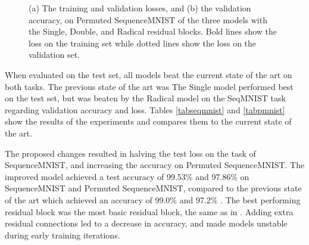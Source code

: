 \documentclass[a4paper, twoside]{article}
\begin{document}
\begin{figure}[h]
    \centering
  	\caption{(a) The training and validation losses, and (b) the validation accuracy, on Permuted SequenceMNIST of the three models with the Single, Double, and Radical residual blocks. Bold lines show the loss on the training set while dotted lines show the loss on the validation set.} \label{figpmnistfig}
\end{figure}

When evaluated on the test set, all models beat the current state of the art on both tasks. The previous state of the art was The Single model performed best on the test set, but was beaten by the Radical model on the SeqMNIST task regarding validation accuracy and loss. Tables \ref{tabseqmnist} and \ref{tabpmnist} show the results of the experiments and compares them to the current state of the art.

The proposed changes resulted in halving the test loss on the task of SequenceMNIST, and increasing the accuracy on Permuted SequenceMNIST. The improved model achieved a test accuracy of 99.53\% and 97.86\% on SequenceMNIST and Permuted SequenceMNIST, compared to the previous state of the art which achieved an accuracy of 99.0\% \cite{dilatedgru} and 97.2\% \cite{tcn}. The best performing residual block was the most basic residual block, the same as in \cite{tcn}. Adding extra residual connections led to a decrease in accuracy, and made models unstable during early training iterations.
\end{document}
